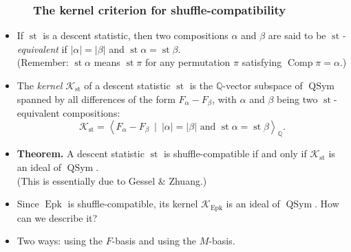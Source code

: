 \documentclass{beamer}
\newcommand{\QQ}{{\mathbb Q}}
\newcommand{\Comp}{\operatorname{Comp}}
\newcommand{\Epk}{\operatorname{Epk}}
\newcommand{\st}{\operatorname{st}}
\newcommand{\QSym}{\operatorname{QSym}}
\newcommand{\calK}{\mathcal{K}}
\newcommand{\fti}[1]{\frametitle{\ \ \ \ \ #1}}
\newcommand{\abs}[1]{\left| #1 \right|}
\newcommand{\defn}[1]{{\color{darkred}\emph{#1}}} %
\theoremstyle{plain}
\begin{document}
\begin{frame}
\fti{The kernel criterion for shuffle-compatibility}

\begin{itemize}

\item If $\st$ is a descent statistic, then two compositions
      $\alpha$ and $\beta$ are said to be \defn{$\st$-equivalent}
      if $\abs{\alpha} = \abs{\beta}$ and $\st\alpha = \st\beta$.
      \\ (Remember: $\st\alpha$ means $\st\pi$ for any permutation
      $\pi$ satisfying $\Comp\pi = \alpha$.)

\pause

\item The \defn{kernel $\calK_{\st}$} of a descent statistic $\st$
      is the $\QQ$-vector subspace of $\QSym$ spanned by all
      differences of the form $F_\alpha - F_\beta$, with $\alpha$
      and $\beta$ being two $\st$-equivalent compositions:
      \[
      \calK_{\st} = \left< F_\alpha - F_\beta \ 
                              \mid \ \abs{\alpha} = \abs{\beta} \text{ and }
                                   \st \alpha = \st \beta \right>_\QQ .
      \]

\pause

\item \textbf{Theorem.} A descent statistic $\st$ is
      shuffle-compatible if and only if $\calK_{\st}$ is an
      ideal of $\QSym$. \\
      (This is essentially due to Gessel \& Zhuang.)

\pause
\item Since $\Epk$ is shuffle-compatible, its kernel $\calK_{\Epk}$
      is an ideal of $\QSym$.
      How can we describe it?

\item Two ways: using the $F$-basis and using the $M$-basis.

\end{itemize}

\end{frame}
\end{document}
